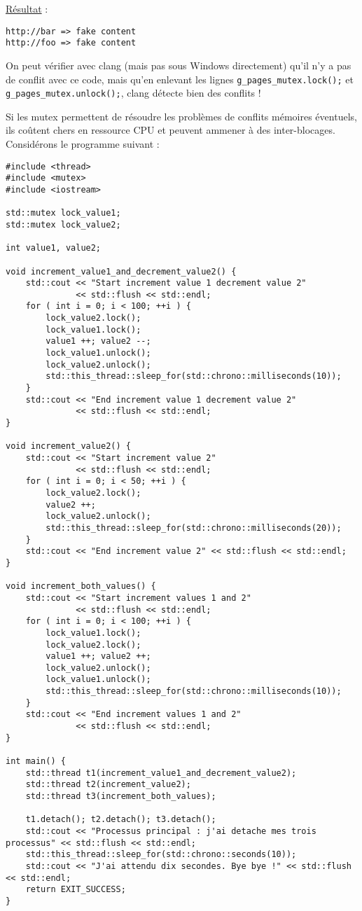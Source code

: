 \documentclass[fleqn,11pt]{article}
\begin{document}
\underline{Résultat} :

\begin{verbatim}
http://bar => fake content
http://foo => fake content
\end{verbatim}

On peut vérifier avec clang (mais pas sous Windows directement) qu'il n'y a pas de conflit avec ce code,
mais qu'en enlevant les lignes \texttt{g\_pages\_mutex.lock();} et \texttt{g\_pages\_mutex.unlock();},
clang détecte bien des conflits !

Si les mutex permettent de résoudre les problèmes de conflits mémoires éventuels, ils coûtent chers
en ressource CPU et peuvent ammener à des inter-blocages. Considérons le programme suivant :

\begin{lstlisting}
#include <thread>
#include <mutex>
#include <iostream>

std::mutex lock_value1;
std::mutex lock_value2;

int value1, value2;

void increment_value1_and_decrement_value2() {
    std::cout << "Start increment value 1 decrement value 2" 
              << std::flush << std::endl;
    for ( int i = 0; i < 100; ++i ) {
        lock_value2.lock();
        lock_value1.lock();
        value1 ++; value2 --;
        lock_value1.unlock();
        lock_value2.unlock();
        std::this_thread::sleep_for(std::chrono::milliseconds(10));
    }
    std::cout << "End increment value 1 decrement value 2" 
              << std::flush << std::endl;
}

void increment_value2() {
    std::cout << "Start increment value 2" 
              << std::flush << std::endl;
    for ( int i = 0; i < 50; ++i ) {
        lock_value2.lock();
        value2 ++;
        lock_value2.unlock();
        std::this_thread::sleep_for(std::chrono::milliseconds(20));
    }
    std::cout << "End increment value 2" << std::flush << std::endl;
}

void increment_both_values() {
    std::cout << "Start increment values 1 and 2" 
              << std::flush << std::endl;
    for ( int i = 0; i < 100; ++i ) {
        lock_value1.lock();
        lock_value2.lock();
        value1 ++; value2 ++;
        lock_value2.unlock();
        lock_value1.unlock();
        std::this_thread::sleep_for(std::chrono::milliseconds(10));
    }
    std::cout << "End increment values 1 and 2" 
              << std::flush << std::endl;
}

int main() {
    std::thread t1(increment_value1_and_decrement_value2);
    std::thread t2(increment_value2);
    std::thread t3(increment_both_values);

    t1.detach(); t2.detach(); t3.detach();
    std::cout << "Processus principal : j'ai detache mes trois processus" << std::flush << std::endl;
    std::this_thread::sleep_for(std::chrono::seconds(10));
    std::cout << "J'ai attendu dix secondes. Bye bye !" << std::flush << std::endl;
    return EXIT_SUCCESS;
}
\end{lstlisting}
\end{document}
